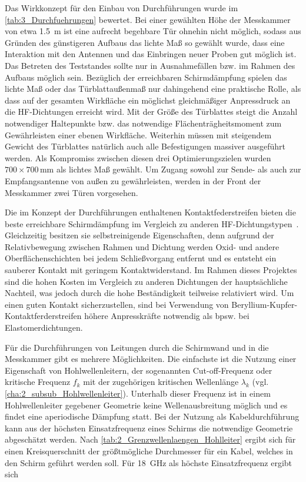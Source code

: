 \par
\vspace{\linespace} 
Das Wirkkonzept für den Einbau von Durchführungen wurde im \Abschnitt\ref{tab:3_Durchfuehrungen} bewertet. Bei einer gewählten Höhe der Messkammer von etwa \SI{1,5}{\meter} ist eine aufrecht begehbare Tür ohnehin nicht möglich, sodass aus Gründen des günstigeren Aufbaus das lichte Maß so gewählt wurde, dass eine Interaktion mit den Antennen und das Einbringen neuer Proben gut möglich ist. Das Betreten des Teststandes sollte nur in Ausnahmefällen bzw. im Rahmen des Aufbaus möglich sein. Bezüglich der erreichbaren Schirmdämpfung spielen das lichte Maß oder das Türblattaußenmaß nur dahingehend eine praktische Rolle, als dass auf der gesamten Wirkfläche ein möglichst gleichmäßiger Anpressdruck an die HF-Dichtungen erreicht wird. Mit der Größe des Türblattes steigt die Anzahl notwendiger Haltepunkte bzw. das notwendige Flächenträgheitsmoment zum Gewährleisten einer ebenen Wirkfläche. Weiterhin müssen mit steigendem Gewicht des Türblattes natürlich auch alle Befestigungen massiver ausgeführt werden. Als Kompromiss zwischen diesen drei Optimierungszielen wurden $700 \times 700\,\si{\milli\meter}$ als lichtes Maß gewählt. Um Zugang sowohl zur Sende- als auch zur Empfangsantenne von außen zu gewährleisten, werden in der Front der Messkammer zwei Türen vorgesehen.
\par
\vspace{\linespace}
Die im Konzept der Durchführungen enthaltenen Kontaktfederstreifen bieten die beste erreichbare Schirmdämpfung im Vergleich zu anderen HF-Dichtungstypen~\cite{EM_Schirmung}. Gleichzeitig besitzen sie selbstreinigende Eigenschaften, denn aufgrund der Relativbewegung zwischen Rahmen und Dichtung werden Oxid- und andere Oberflächenschichten bei jedem Schließvorgang entfernt und es entsteht ein sauberer Kontakt mit geringem Kontaktwiderstand. Im Rahmen dieses Projektes sind die hohen Kosten im Vergleich zu anderen Dichtungen der hauptsächliche Nachteil, was jedoch durch die hohe Beständigkeit teilweise relativiert wird. Um einen guten Kontakt sicherzustellen, sind bei Verwendung von Beryllium-Kupfer-Kontaktferderstreifen höhere Anpresskräfte notwendig als bpsw. bei Elastomerdichtungen.  
\par
\vspace{\linespace}
Für die Durchführungen von Leitungen durch die Schirmwand und in die Messkammer gibt es mehrere Möglichkeiten. Die einfachste ist die Nutzung einer Eigenschaft von Hohlwellenleitern, der sogenannten Cut-off-Frequenz oder kritische Frequenz $f_k$ mit der zugehörigen kritischen Wellenlänge $\lambda_k$ (vgl. \Abschnitt\ref{cha:2_subsub_Hohlwellenleiter}). Unterhalb dieser Frequenz ist in einem Hohlwellenleiter gegebener Geometrie keine Wellenausbreitung möglich und es findet eine aperiodische Dämpfung statt. Bei der Nutzung als Kabeldurchführung kann aus der höchsten Einsatzfrequenz eines Schirms die notwendige Geometrie abgeschätzt werden. Nach \Tabelle\ref{tab:2_Grenzwellenlaengen_Hohlleiter} ergibt sich für einen Kreisquerschnitt der größtmögliche Durchmesser für ein Kabel, welches in den Schirm geführt werden soll. Für \SI{18}{\giga\hertz} als höchste Einsatzfrequenz ergibt sich


